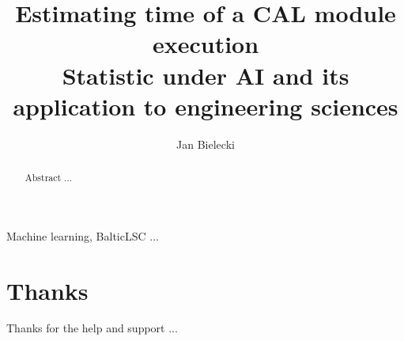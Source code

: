 \documentclass[twocolumn,twoside]{Jornadas}
\begin{document}
\title{
	Estimating time of a CAL module execution \\
	\large Statistic under AI and its application to engineering sciences
}

\author{%
     Jan Bielecki%
}

\maketitle
\markboth{}{}
\pagestyle{empty} 
\thispagestyle{empty} %

\begin{abstract}
Abstract ...
\end{abstract}

\begin{keywords}
Machine learning, BalticLSC ...
\end{keywords}









\section*{Thanks}

Thanks for the help and support ...
\nocite{*}


\end{document}
